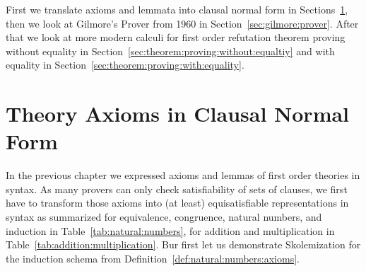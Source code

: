 First we translate axioms and lemmata into clausal normal form in Sections~\ref{sec:clausal:normal:form},
then we look at Gilmore's Prover from 1960 in Section~\ref{sec:gilmore:prover}.
After that we look at more modern calculi for first order refutation theorem proving
without equality in Section~\ref{sec:theorem:proving:without:equaltiy} and with equality in Section~\ref{sec:theorem:proving:with:equality}.


%
%
%

%
%

\section{Theory Axioms in Clausal Normal Form}\label{sec:clausal:normal:form}

In the previous chapter we expressed axioms and lemmas of first order theories in \FOF{} syntax.
As many provers can only check satisfiability of sets of clauses, 
we first have to transform
those axioms into (at least) equisatisfiable representations in \CNF{} syntax
as summarized for equivalence, congruence, natural numbers, and induction in Table~\vref{tab:natural:numbers},
for addition and multiplication in Table~\vref{tab:addition:multiplication}.
Bur first let us demonstrate Skolemization for the induction schema from Definition~\vref{def:natural:numbers:axioms}.

